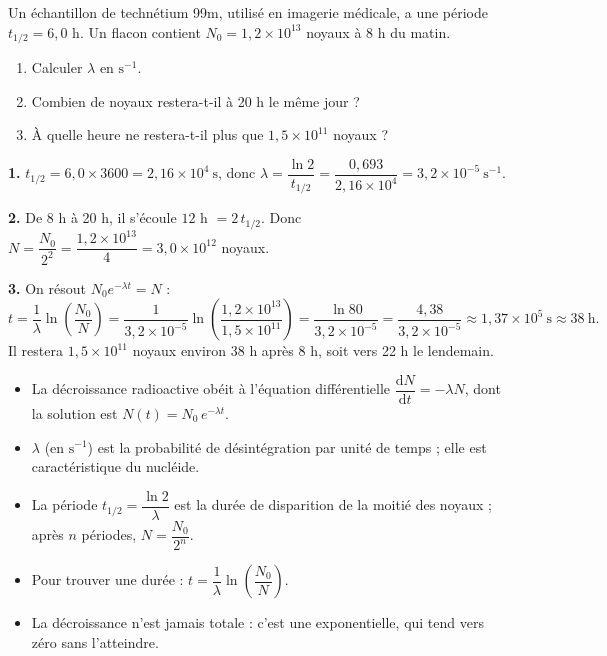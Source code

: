 \documentclass[11pt]{article}
\begin{document}
\begin{exercice}
Un échantillon de technétium 99m, utilisé en imagerie médicale, a une période $t_{1/2} = 6{,}0$ h. Un flacon contient $N_0 = 1{,}2\times 10^{13}$ noyaux à 8 h du matin.
\begin{enumerate}
\item Calculer $\lambda$ en $\mathrm{s^{-1}}$.
\item Combien de noyaux restera-t-il à 20 h le même jour ?
\item À quelle heure ne restera-t-il plus que $1{,}5\times 10^{11}$ noyaux ?
\end{enumerate}
\end{exercice}

\begin{corrige}
\textbf{1.} $t_{1/2} = 6{,}0\times 3600 = 2{,}16\times 10^{4}\ \mathrm{s}$, donc $\lambda = \dfrac{\ln 2}{t_{1/2}} = \dfrac{0{,}693}{2{,}16\times 10^{4}} = 3{,}2\times 10^{-5}\ \mathrm{s^{-1}}$.

\textbf{2.} De 8 h à 20 h, il s'écoule $12$ h $= 2\,t_{1/2}$. Donc $N = \dfrac{N_0}{2^2} = \dfrac{1{,}2\times 10^{13}}{4} = 3{,}0\times 10^{12}$ noyaux.

\textbf{3.} On résout $N_0 e^{-\lambda t} = N$ :
\[ t = \dfrac{1}{\lambda}\ln\!\left(\dfrac{N_0}{N}\right) = \dfrac{1}{3{,}2\times 10^{-5}}\ln\!\left(\dfrac{1{,}2\times 10^{13}}{1{,}5\times 10^{11}}\right) = \dfrac{\ln 80}{3{,}2\times 10^{-5}} = \dfrac{4{,}38}{3{,}2\times 10^{-5}} \approx 1{,}37\times 10^{5}\ \mathrm{s} \approx 38\ \mathrm{h}. \]
Il restera $1{,}5\times 10^{11}$ noyaux environ 38 h après 8 h, soit vers 22 h le lendemain.
\end{corrige}

\begin{aretenir}
\begin{itemize}
\item La décroissance radioactive obéit à l'équation différentielle $\dfrac{\mathrm{d}N}{\mathrm{d}t} = -\lambda N$, dont la solution est $N(t) = N_0\,e^{-\lambda t}$.
\item $\lambda$ (en $\mathrm{s^{-1}}$) est la probabilité de désintégration par unité de temps ; elle est caractéristique du nucléide.
\item La période $t_{1/2} = \dfrac{\ln 2}{\lambda}$ est la durée de disparition de la moitié des noyaux ; après $n$ périodes, $N = \dfrac{N_0}{2^n}$.
\item Pour trouver une durée : $t = \dfrac{1}{\lambda}\ln\!\left(\dfrac{N_0}{N}\right)$.
\item La décroissance n'est jamais totale : c'est une exponentielle, qui tend vers zéro sans l'atteindre.
\end{itemize}
\end{aretenir}
\end{document}
